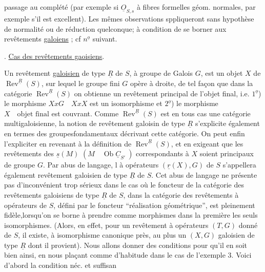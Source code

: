 
passage au complété (par exemple si $\underline{O}_{S,s}$ à fibres formelles géom. normales, par exemple s'il est excellent). Les mêmes observations sppliqueront sans hypothèse de normalité ou de réduction quelconque; à condition de se borner aux revêtements  \uline{galoiens} ; cf $n^{\underline{o}}$ suivant.

. \uline{Cas des revêtements gaoisiens}.

Un revêtement \uline{galoisien} de type $\underline{R}$ de $S$, à groupe de Galois $G$, est un objet $X$ de $\operatorname{Rev}^{\underline{R}}(S)$, sur lequel le groupe fini $G$ opère à droite, de tel façon que dans la catégorie $\operatorname{Rev}^{\underline{R}}(S)$ on obtienne un revêtement principal de l'objet final, i.e. $1^{\underline{o}}$) le morphisme $XxG\quad XxX$ est un isomorphisme et $2^{\underline{o}}$) le morphisme $X\quad\text{objet final}$ est couvrant. Comme $\operatorname{Rev}^{\underline{R}}(S)$ est en tous cas une catégorie multigaloisienne, la notion de revêtement galoisin de type $\underline{R}$ s'explicite également en termes des groupesfondamentaux décrivant cette catégorie. On peut enfin l'expliciter en revenant à la définition de $\operatorname{Rev}^{\underline{R}}(S)$, et en exigeant que les revêtements des $\underline{s}(M)$ $(M\quad\operatorname{Ob}\underline{C}_{S'}\ )$ correspondants à $X$ soient principaux de groupe $G$. Par abus de langage, l à opérateurs $(\underline{r}(X),G)$ de $S$ s'appellera également revêtement galoisien de type $\underline{R}$ de $S$. Cet abus de langage ne présente pas d'inconvénient trop sérieux dans le cas où le foncteur de la catégorie des revêtements galoisiens de type $\underline{R}$ de $S$, dans la catégorie des revêtements à opérateurs de $S$, défini par le foncteur ``réalisation géométrique'', est pleinement fidèle,lorsqu'on se borne à prendre comme morphismes dans la première les seuls isomorphismes. (Alors, en effet, pour un revêtement à opérateurs $(T,G)$ donné de $S$, il existe, à isomorphisme canonique près, au plus un $(X,G)$  galoisien de type $\underline{R}$ dont il provient). Nous allons donner des conditions pour qu'il en soit bien ainsi, en nous plaçant comme d'habitude dans le cas de l'exemple 3. Voici d'abord la condition néc. et suffisan
